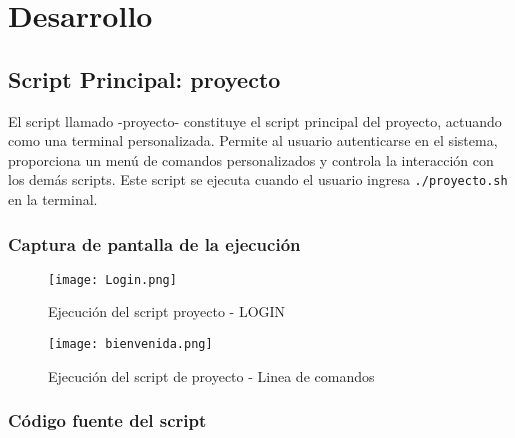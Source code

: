\documentclass{article}
\begin{document}
\pagebreak
  \section{Desarrollo}
  \subsection{Script Principal: proyecto}

El script llamado -proyecto- constituye el script principal del proyecto, actuando como una terminal personalizada. Permite al usuario autenticarse en el sistema, proporciona un menú de comandos personalizados y controla la interacción con los demás scripts.
Este script se ejecuta cuando el usuario ingresa \texttt{./proyecto.sh} en la terminal.

\subsubsection{Captura de pantalla de la ejecución}

\begin{figure}[!ht]
\centering
\texttt{[image: Login.png]}
\caption{Ejecución del script proyecto - LOGIN}
\end{figure}

\begin{figure}[h!]
\centering
\texttt{[image: bienvenida.png]}
\caption{Ejecución del script de proyecto - Linea de comandos}
\end{figure}

\subsubsection{Código fuente del script}
\end{document}
